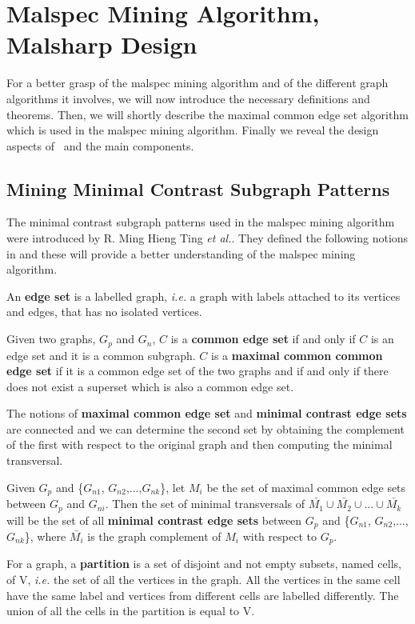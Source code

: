 \chapter{Malspec Mining Algorithm, Malsharp Design}
\label{chapter:third}

For a better grasp of the malspec mining algorithm and of the different graph algorithms it involves, we will now introduce the necessary definitions and theorems. Then, we will shortly describe the maximal common edge set algorithm which is used in the malspec mining algorithm. Finally we reveal the design aspects of \project\ and the main components.

\section{Mining Minimal Contrast Subgraph Patterns}
\label{third:graph-defs}

The minimal contrast subgraph patterns used in the malspec mining algorithm were introduced by R. Ming Hieng Ting \textit{et al.}. They defined the following notions in \cite{minimal-contrast-subgraph} and these will provide a better understanding of the malspec mining algorithm.

An \textbf{edge set} is a labelled graph, \textit{i.e.} a graph with labels attached to its vertices and edges, that has no isolated vertices.

Given two graphs, $G_{p}$ and $G_{n}$, $C$ is a \textbf{common edge set} if and only if $C$ is an edge set and it is a common subgraph. $C$ is a \textbf{maximal common common edge set} if it is a common edge set of the two graphs and if and only if there does not exist a superset which is also a common edge set.

The notions of \textbf{maximal common edge set} and \textbf{minimal contrast edge sets} are connected and we can determine the second set by obtaining the complement of the first with respect to the original graph and then computing the minimal transversal.

Given $G_{p}$ and \{$G_{n1}$, $G_{n2}$,...,$G_{nk}$\}, let $M_{i}$ be the set of maximal common edge sets between $G_{p}$ and $G_{ni}$. Then the set of minimal transversals of $\bar{M_{1}} \cup \bar{M_{2}} \cup ... \cup \bar{M_{k}}$ will be the set of all \textbf{minimal contrast edge sets} between $G_{p}$ and \{$G_{n1}$, $G_{n2}$,...,$G_{nk}$\}, where $\bar{M_{i}}$ is the graph complement of $M_{i}$ with respect to $G_{p}$.

For a graph, a \textbf{partition} is a set of disjoint and not empty subsets, named cells, of V, \textit{i.e.} the set of all the vertices in the graph. All the vertices in the same cell have the same label and vertices from different cells are labelled differently. The union of all the cells in the partition is equal to V.

